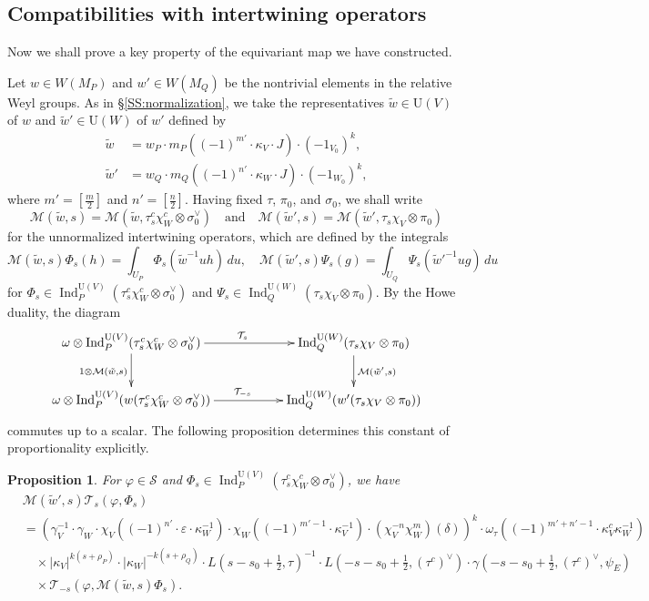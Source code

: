 \documentclass[11pt]{amsart}
\numberwithin{equation}{section}
\theoremstyle{plain}
\newtheorem{prop}[thm]{Proposition}
\theoremstyle{definition}
\theoremstyle{remark}
\def\Ind{\operatorname{Ind}}
\def\U{\mathrm{U}}
\def\M{\mathcal{M}}
\def\T{\mathcal{T}}
\def\s{\mathscr{S}}
\begin{document}
\subsection{Compatibilities with intertwining operators}

Now we shall prove a key property of the equivariant map we have constructed.

Let $w \in W(M_P)$ and $w' \in W(M_Q)$ be the nontrivial elements in the relative Weyl groups.
As in \S \ref{SS:normalization}, we take the representatives $\tilde{w} \in \U(V)$ of $w$ and $\tilde{w}' \in \U(W)$ of $w'$ defined by 
\begin{align*}
 \tilde{w}  & = w_P \cdot m_P((-1)^{m'} \cdot \kappa_V \cdot J) \cdot (- 1_{V_0})^k, \\
 \tilde{w}' & = w_Q \cdot m_Q((-1)^{n'} \cdot \kappa_W \cdot J) \cdot (- 1_{W_0})^k,
\end{align*}
where $m' = [\frac{m}{2}]$ and $n' = [\frac{n}{2}]$.
Having fixed $\tau$, $\pi_0$, and $\sigma_0$, we shall write 
\[
 \M(\tilde{w},s) = \M(\tilde{w},\tau^c_s \chi_W^c \otimes \sigma_0^\vee)
 \quad \text{and} \quad
 \M(\tilde{w}',s) = \M(\tilde{w}',\tau_s \chi_V \otimes \pi_0)
\]
for the unnormalized intertwining operators, which are defined by the integrals
\[
 \M(\tilde{w},s) \Phi_s(h) = \int_{U_P} \Phi_s(\tilde{w}^{-1} u h) \, du, \quad
 \M(\tilde{w}',s) \Psi_s(g) = \int_{U_Q} \Psi_s(\tilde{w}'^{-1} u g) \, du 
\]
for $\Phi_s \in \Ind^{\U(V)}_P(\tau^c_s \chi_W^c \otimes \sigma_0^\vee)$ and $\Psi_s \in \Ind^{\U(W)}_Q(\tau_s \chi_V \otimes \pi_0)$.
By the Howe duality, the diagram
\[
  \xymatrix{
  \omega \otimes 
  \Ind^{\U(V)}_P(\tau^c_s \chi_W^c \otimes \sigma_0^\vee)
  \ar@{->}[rr]^{\T_s} \ar@{->}[d]_{1 \otimes \M(\tilde{w},s)} & &
  \Ind^{\U(W)}_Q(\tau_s \chi_V \otimes \pi_0) \ar@{->}[d]^{\M(\tilde{w}',s)} \\
  \omega \otimes 
  \Ind^{\U(V)}_P(w(\tau^c_s \chi_W^c \otimes \sigma_0^\vee))
   \ar@{->}[rr]^{\T_{-s}}
  & & \Ind^{\U(W)}_Q(w'(\tau_s \chi_V \otimes \pi_0))}
\]
commutes up to a scalar.
The following proposition determines this constant of proportionality explicitly.

\begin{prop} \label{P:io}
For $\varphi \in \s$ and $\Phi_s \in \Ind^{\U(V)}_P(\tau^c_s \chi_W^c \otimes \sigma_0^\vee)$, we have
\begin{align*}
 & \M(\tilde{w}', s) \T_s(\varphi, \Phi_s) \\
 & = ( \gamma_V^{-1} \cdot \gamma_W
 \cdot \chi_V((-1)^{n'} \cdot \varepsilon \cdot \kappa_W^{-1})
 \cdot \chi_W((-1)^{m'-1} \cdot \kappa_V^{-1})
 \cdot (\chi_V^{-n} \chi_W^m)(\delta))^k
 \cdot \omega_{\tau}((-1)^{m'+n'-1} \cdot \kappa_V^c \kappa_W^{-1}) \\
 & \quad \times |\kappa_V|^{k(s+\rho_P)} \cdot |\kappa_W|^{-k(s+\rho_Q)}
 \cdot L(s-s_0+\tfrac{1}{2}, \tau)^{-1}
 \cdot L(-s-s_0+\tfrac{1}{2}, (\tau^c)^\vee) \cdot \gamma(-s-s_0+\tfrac{1}{2}, (\tau^c)^\vee, \psi_E) \\
 & \quad \times \T_{-s}(\varphi, \M(\tilde{w}, s) \Phi_s).
\end{align*}
\end{prop}
\end{document}
